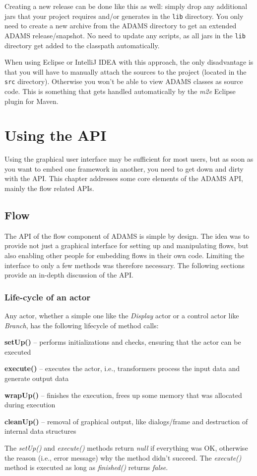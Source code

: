 Creating a new release can be done like this as well: simply drop any 
additional jars that your project requires and/or generates in the \texttt{lib}
directory. You only need to create a new archive from the ADAMS directory to
get an extended ADAMS release/snapshot. No need to update any scripts, as all
jars in the \texttt{lib} directory get added to the classpath automatically.

When using Eclipse or IntelliJ IDEA with this approach, the only disadvantage is that you will
have to manually attach the sources to the project (located in the 
\texttt{src} directory). Otherwise you won't be able to view ADAMS classes
as source code. This is something that gets handled automatically by the
\textit{m2e} Eclipse plugin for Maven.

\chapter{Using the API}
Using the graphical user interface may be sufficient for most users, but as soon
as you want to embed one framework in another, you need to get down and dirty
with the API. This chapter addresses some core elements of the ADAMS API, mainly
the flow related APIs.

\section{Flow}
The API of the flow component of ADAMS is simple by design. The idea was to
provide not just a graphical interface for setting up and manipulating flows,
but also enabling other people for embedding flows in their own code. Limiting
the interface to only a few methods was therefore necessary. The following 
sections provide an in-depth discussion of the API.

\subsection{Life-cycle of an actor}
Any actor, whether a simple one like the \textit{Display} actor or a control
actor like \textit{Branch}, has the following lifecycle of method calls:
\begin{tight_itemize}
  \item \textbf{setUp()} -- performs initializations and checks, ensuring that
  the actor can be executed
  \item \textbf{execute()} -- executes the actor, i.e., transformers process the
  input data and generate output data
  \item \textbf{wrapUp()} -- finishes the execution, frees up some memory that
  was allocated during execution
  \item \textbf{cleanUp()} -- removal of graphical output, like dialogs/frame
  and destruction of internal data structures
\end{tight_itemize}
The \textit{setUp()} and \textit{execute()} methods return
\textit{null} if everything was OK, otherwise the reason (i.e., error message) why
the method didn't succeed. The \textit{execute()} method is executed as long as
\textit{finished()} returns \textit{false}.

